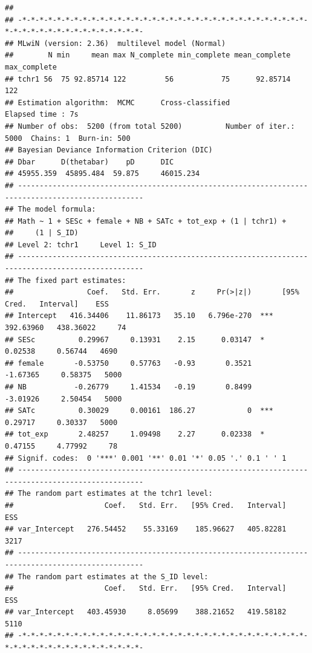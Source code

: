\documentclass[
]{book}
\begin{document}
\begin{verbatim}
## 
## -*-*-*-*-*-*-*-*-*-*-*-*-*-*-*-*-*-*-*-*-*-*-*-*-*-*-*-*-*-*-*-*-*-*-*-*-*-*-*-*-*-*-*-*-*-*-*-*-*- 
## MLwiN (version: 2.36)  multilevel model (Normal) 
##        N min     mean max N_complete min_complete mean_complete max_complete
## tchr1 56  75 92.85714 122         56           75      92.85714          122
## Estimation algorithm:  MCMC      Cross-classified              Elapsed time : 7s 
## Number of obs:  5200 (from total 5200)          Number of iter.: 5000  Chains: 1  Burn-in: 500 
## Bayesian Deviance Information Criterion (DIC)
## Dbar      D(thetabar)    pD      DIC
## 45955.359  45895.484  59.875     46015.234  
## --------------------------------------------------------------------------------------------------- 
## The model formula:
## Math ~ 1 + SESc + female + NB + SATc + tot_exp + (1 | tchr1) + 
##     (1 | S_ID)
## Level 2: tchr1     Level 1: S_ID      
## --------------------------------------------------------------------------------------------------- 
## The fixed part estimates:  
##                 Coef.   Std. Err.       z     Pr(>|z|)       [95% Cred.   Interval]    ESS 
## Intercept   416.34406    11.86173   35.10   6.796e-270  ***   392.63960   438.36022     74 
## SESc          0.29967     0.13931    2.15      0.03147  *       0.02538     0.56744   4690 
## female       -0.53750     0.57763   -0.93       0.3521         -1.67365     0.58375   5000 
## NB           -0.26779     1.41534   -0.19       0.8499         -3.01926     2.50454   5000 
## SATc          0.30029     0.00161  186.27            0  ***     0.29717     0.30337   5000 
## tot_exp       2.48257     1.09498    2.27      0.02338  *       0.47155     4.77992     78 
## Signif. codes:  0 '***' 0.001 '**' 0.01 '*' 0.05 '.' 0.1 ' ' 1  
## --------------------------------------------------------------------------------------------------- 
## The random part estimates at the tchr1 level: 
##                     Coef.   Std. Err.   [95% Cred.   Interval]    ESS 
## var_Intercept   276.54452    55.33169    185.96627   405.82281   3217 
## --------------------------------------------------------------------------------------------------- 
## The random part estimates at the S_ID level: 
##                     Coef.   Std. Err.   [95% Cred.   Interval]    ESS 
## var_Intercept   403.45930     8.05699    388.21652   419.58182   5110 
## -*-*-*-*-*-*-*-*-*-*-*-*-*-*-*-*-*-*-*-*-*-*-*-*-*-*-*-*-*-*-*-*-*-*-*-*-*-*-*-*-*-*-*-*-*-*-*-*-*-
\end{verbatim}
\end{document}
